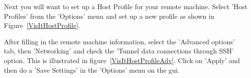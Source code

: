 \documentclass[12pt]{article}
\begin{document}
Next you will want to set up a Host Profile for your remote
machine. Select 'Host Profiles' from the 'Options' menu and set up a
new profile as shown in Figure~\ref{VisItHostProfile}.








After filling in the remote machine information, select the 'Advanced
options' tab, then 'Networking' and check the 'Tunnel data connections
through SSH' option. This is illustrated in
figure~\ref{VisItHostProfileAdv}. Click on 'Apply' and then do a 'Save
Settings' in the 'Options' menu on the gui.






\end{document}
